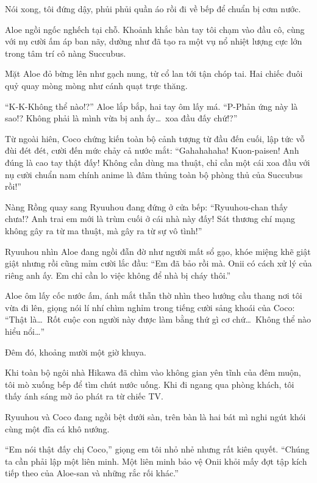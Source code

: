 \documentclass[../main.tex]{subfiles}
\begin{document}
Nói xong, tôi đứng dậy, phủi phủi quần áo rồi đi về bếp để chuẩn bị cơm nước.

Aloe ngồi ngốc nghếch tại chỗ. Khoảnh khắc bàn tay tôi chạm vào đầu cô, cùng với nụ cười ấm áp ban nãy, dường như đã tạo ra một vụ nổ nhiệt lượng cực lớn trong tâm trí cô nàng Succubus.

Mặt Aloe đỏ bừng lên như gạch nung, từ cổ lan tới tận chóp tai. Hai chiếc đuôi quỷ quay mòng mòng như cánh quạt trực thăng.

``K-K-Không thể nào!?'' Aloe lắp bắp, hai tay ôm lấy má. ``P-Phản ứng này là sao!? Không phải là mình vừa bị anh ấy\dots\ xoa đầu đấy chứ!?''

Từ ngoài hiên, Coco chứng kiến toàn bộ cảnh tượng từ đầu đến cuối, lập tức vỗ đùi đét đét, cười đến mức chảy cả nước mắt: ``Gahahahaha! Kuon-paisen! Anh đúng là cao tay thật đấy! Không cần dùng ma thuật, chỉ cần một cái xoa đầu với nụ cười chuẩn nam chính anime là đâm thủng toàn bộ phòng thủ của Succubus rồi!''

Nàng Rồng quay sang Ryuuhou đang đứng ở cửa bếp: ``Ryuuhou-chan thấy chưa!? Anh trai em mới là trùm cuối ở cái nhà này đấy! Sát thương chí mạng không gây ra từ ma thuật, mà gây ra từ sự vô tình!''

Ryuuhou nhìn Aloe đang ngồi đẫn đờ như người mất sổ gạo, khóe miệng khẽ giật giật nhưng rồi cũng mỉm cười lắc đầu: ``Em đã bảo rồi mà. Onii có cách xử lý của riêng anh ấy. Em chỉ cần lo việc không để nhà bị cháy thôi.''

Aloe ôm lấy cốc nước ấm, ánh mắt thẫn thờ nhìn theo hướng cầu thang nơi tôi vừa đi lên, giọng nói lí nhí chìm nghỉm trong tiếng cười sảng khoái của Coco: ``Thật là\dots\ Rốt cuộc con người này được làm bằng thứ gì cơ chứ\dots\ Không thể nào hiểu nổi\dots''

\omk

Đêm đó, khoảng mười một giờ khuya.

Khi toàn bộ ngôi nhà Hikawa đã chìm vào không gian yên tĩnh của đêm muộn, tôi mò xuống bếp để tìm chút nước uống. Khi đi ngang qua phòng khách, tôi thấy ánh sáng mờ ảo phát ra từ chiếc TV.

Ryuuhou và Coco đang ngồi bệt dưới sàn, trên bàn là hai bát mì nghi ngút khói cùng một đĩa cá khô nướng.

``Em nói thật đấy chị Coco,'' giọng em tôi nhỏ nhẻ nhưng rất kiên quyết. ``Chúng ta cần phải lập một liên minh. Một liên minh bảo vệ Onii khỏi mấy đợt tập kích tiếp theo của Aloe-san và những rắc rối khác.''
\end{document}

